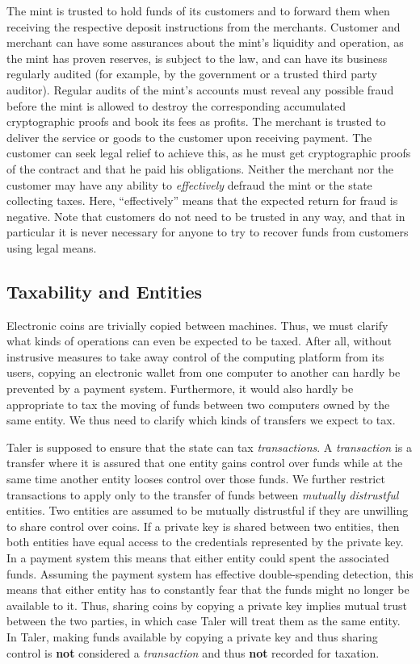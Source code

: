 \documentclass{llncs}
\begin{document}
The mint is trusted to hold funds of its customers and to forward them
when receiving the respective deposit instructions from the merchants.
Customer and merchant can have some assurances about the mint's
liquidity and operation, as the mint has proven reserves, is subject
to the law, and can have its business regularly audited (for
example, by the government or a trusted third party auditor).
Regular audits of the mint's accounts must reveal any possible fraud
before the mint is allowed to destroy the corresponding accumulated
cryptographic proofs and book its fees as profits.
%
The merchant is trusted to deliver the service or goods to the
customer upon receiving payment.  The customer can seek legal relief
to achieve this, as he must get cryptographic proofs of the contract
and that he paid his obligations.
%
Neither the merchant nor the customer may have any ability to {\em
  effectively} defraud the mint or the state collecting taxes.  Here,
``effectively'' means that the expected return for fraud is negative.
Note that customers do not need to be trusted in any way, and that in
particular it is never necessary for anyone to try to recover funds
from customers using legal means.


\subsection{Taxability and Entities}

Electronic coins are trivially copied between machines.  Thus, we must
clarify what kinds of operations can even be expected to be taxed.
After all, without instrusive measures to take away control of the
computing platform from its users, copying an electronic wallet from
one computer to another can hardly be prevented by a payment system.
Furthermore, it would also hardly be appropriate to tax the moving of
funds between two computers owned by the same entity.  We thus
need to clarify which kinds of transfers we expect to tax.

Taler is supposed to ensure that the state can tax {\em transactions}.
A {\em transaction} is a transfer where it is assured that one entity
gains control over funds while at the same time another entity looses
control over those funds.  We further restrict transactions to apply
only to the transfer of funds between {\em mutually distrustful}
entities.  Two entities are assumed to be mutually distrustful if they
are unwilling to share control over coins.  If a private key is shared
between two entities, then both entities have equal access to the
credentials represented by the private key.  In a payment system this
means that either entity could spent the associated funds.  Assuming
the payment system has effective double-spending detection, this means
that either entity has to constantly fear that the funds might no
longer be available to it.  Thus, sharing coins by copying a private
key implies mutual trust between the two parties, in which case Taler
will treat them as the same entity.  In Taler, making funds available
by copying a private key and thus sharing control is {\bf not}
considered a {\em transaction} and thus {\bf not} recorded for
taxation.
\end{document}
